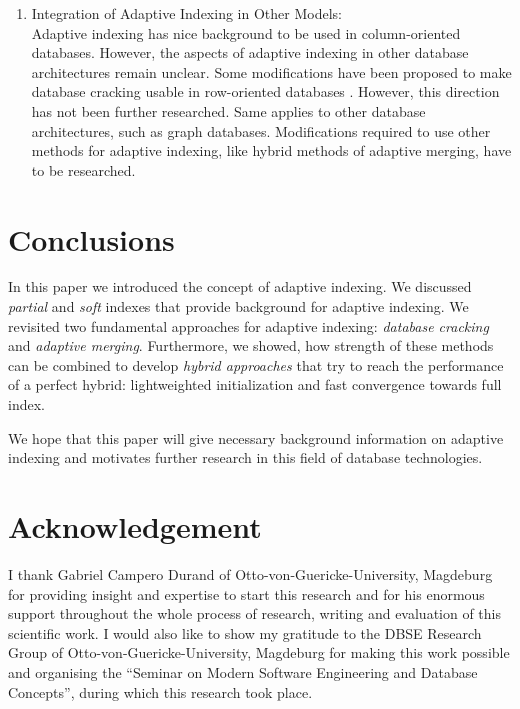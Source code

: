 \documentclass[10pt, conference, compsocconf]{IEEEtran}
\begin{document}
\begin{itemize}
\begin{enumerate}
\item{Integration of Adaptive Indexing in Other Models:}\\
Adaptive indexing has nice background to be used in column-oriented databases. However, the aspects of adaptive indexing in other database architectures remain unclear. Some modifications have been proposed to make database cracking usable in row-oriented databases \cite{cracking}. However, this direction has not been further researched. Same applies to other database architectures, such as graph databases. Modifications required to use other methods for adaptive indexing, like hybrid methods of adaptive merging, have to be researched.
\end{enumerate}
\end{itemize}


\section{Conclusions}
\label{sec:conc}
In this paper we introduced the concept of adaptive indexing. We discussed \emph{partial} and \emph{soft} indexes that provide background for adaptive indexing. We revisited two fundamental approaches for adaptive indexing: \emph{database cracking} and \emph{adaptive merging}. Furthermore, we showed, how strength of these methods can be combined to develop \emph{hybrid approaches} that try to reach the performance of a perfect hybrid: lightweighted initialization and fast convergence towards full index.

We hope that this paper will give necessary background information on adaptive indexing and motivates further research in this field of database technologies.

\section*{Acknowledgement}
I thank Gabriel Campero Durand of Otto-von-Guericke-University, Magdeburg for providing insight and expertise to start this research and for his enormous support throughout the whole process of research, writing and evaluation of this scientific work. I would also like to show my gratitude to the DBSE Research Group of Otto-von-Guericke-University, Magdeburg for making this work possible and organising the ``Seminar on Modern Software Engineering and Database Concepts'', during which this research took place.
\end{document}

